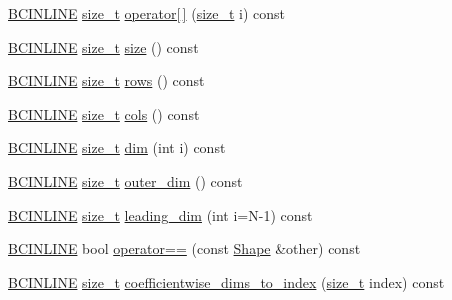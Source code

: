 \begin{DoxyCompactItemize}
\item 
\hyperlink{common_8h_a6699e8b0449da5c0fafb878e59c1d4b1}{B\+C\+I\+N\+L\+I\+NE} \hyperlink{structbc_1_1Shape_a63f974ebdb0e3755ef3140b17abcf235}{size\+\_\+t} \hyperlink{structbc_1_1Shape_a3843811a9a21dfc515d156f7482c2db0}{operator\mbox{[}$\,$\mbox{]}} (\hyperlink{structbc_1_1Shape_a63f974ebdb0e3755ef3140b17abcf235}{size\+\_\+t} i) const
\item 
\hyperlink{common_8h_a6699e8b0449da5c0fafb878e59c1d4b1}{B\+C\+I\+N\+L\+I\+NE} \hyperlink{structbc_1_1Shape_a63f974ebdb0e3755ef3140b17abcf235}{size\+\_\+t} \hyperlink{structbc_1_1Shape_ad060b7cb938ac27e710901026ac46a01}{size} () const
\item 
\hyperlink{common_8h_a6699e8b0449da5c0fafb878e59c1d4b1}{B\+C\+I\+N\+L\+I\+NE} \hyperlink{structbc_1_1Shape_a63f974ebdb0e3755ef3140b17abcf235}{size\+\_\+t} \hyperlink{structbc_1_1Shape_a528691cf43e9d1bdbb4c8405292092f2}{rows} () const
\item 
\hyperlink{common_8h_a6699e8b0449da5c0fafb878e59c1d4b1}{B\+C\+I\+N\+L\+I\+NE} \hyperlink{structbc_1_1Shape_a63f974ebdb0e3755ef3140b17abcf235}{size\+\_\+t} \hyperlink{structbc_1_1Shape_aa92f7525e2f0860ad271ebbae1cf29fb}{cols} () const
\item 
\hyperlink{common_8h_a6699e8b0449da5c0fafb878e59c1d4b1}{B\+C\+I\+N\+L\+I\+NE} \hyperlink{structbc_1_1Shape_a63f974ebdb0e3755ef3140b17abcf235}{size\+\_\+t} \hyperlink{structbc_1_1Shape_acced7d5436419a46dbb2736457f6585c}{dim} (int i) const
\item 
\hyperlink{common_8h_a6699e8b0449da5c0fafb878e59c1d4b1}{B\+C\+I\+N\+L\+I\+NE} \hyperlink{structbc_1_1Shape_a63f974ebdb0e3755ef3140b17abcf235}{size\+\_\+t} \hyperlink{structbc_1_1Shape_a949fecc85ed922edd5ffb185825ef22e}{outer\+\_\+dim} () const
\item 
\hyperlink{common_8h_a6699e8b0449da5c0fafb878e59c1d4b1}{B\+C\+I\+N\+L\+I\+NE} \hyperlink{structbc_1_1Shape_a63f974ebdb0e3755ef3140b17abcf235}{size\+\_\+t} \hyperlink{structbc_1_1Shape_ab0f160384387b063fa2198cc0a5b1597}{leading\+\_\+dim} (int i=N-\/1) const
\item 
\hyperlink{common_8h_a6699e8b0449da5c0fafb878e59c1d4b1}{B\+C\+I\+N\+L\+I\+NE} bool \hyperlink{structbc_1_1Shape_a378fc6e7baaa057cee70a0b691e194a6}{operator==} (const \hyperlink{structbc_1_1Shape}{Shape} \&other) const
\item 
\hyperlink{common_8h_a6699e8b0449da5c0fafb878e59c1d4b1}{B\+C\+I\+N\+L\+I\+NE} \hyperlink{structbc_1_1Shape_a63f974ebdb0e3755ef3140b17abcf235}{size\+\_\+t} \hyperlink{structbc_1_1Shape_a6fad543e17ae86758fa40ecb0aa3cbf7}{coefficientwise\+\_\+dims\+\_\+to\+\_\+index} (\hyperlink{structbc_1_1Shape_a63f974ebdb0e3755ef3140b17abcf235}{size\+\_\+t} index) const

\end{DoxyCompactItemize}
